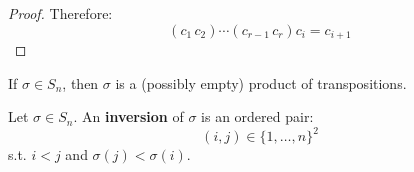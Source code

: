 \begin{itemize}
\begin{proof}
        Therefore:
        \begin{equation}
            (c_1\,c_2)\cdots (c_{r-1}\,c_r)c_i = c_{i+1}
        \end{equation}
    \end{proof}
    \begin{corollary}
        If $\sigma \in S_n$, then $\sigma$ is a (possibly empty) product of transpositions.
    \end{corollary}
    \begin{definition}
        Let $\sigma \in S_n$. An \textbf{inversion} of $\sigma$ is an ordered pair:
        \begin{equation}
            (i,j) \in \{1,\dots,n\}^2
        \end{equation}
        s.t. $i<j$ and $\sigma(j) < \sigma(i)$.
        \vspace{2mm}


\end{definition}
\end{itemize}
